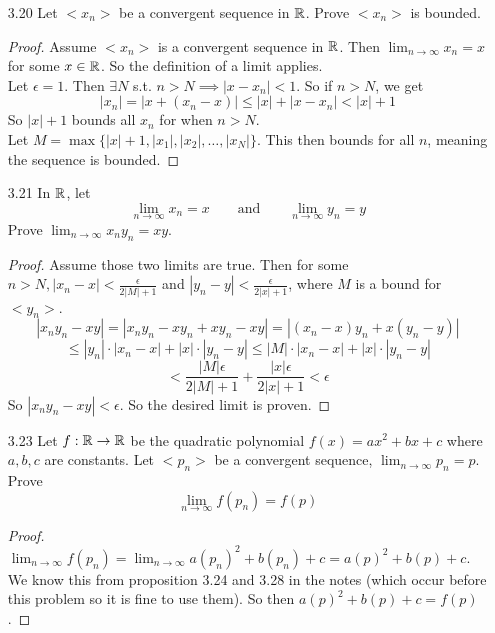 \documentclass[14pt]{extarticle}
\begin{document}
\begin{enumerate}
		\item[3.20] Let $<x_n>$ be a convergent sequence in $\mathbb{R}$. Prove $<x_n>$ is bounded.
		\begin{proof}
			Assume $<x_n>$ is a convergent sequence in $\mathbb{R}$. Then $\lim_{n\rightarrow\infty} x_n = x$ for some $x\in\mathbb{R}$. So the definition of a limit applies.\\
			Let $\epsilon = 1$. Then $\exists N$ s.t. $n > N \implies |x - x_n| < 1$. So if $n > N$, we get
			\[|x_n| = |x + (x_n - x)| \leq |x| + |x-x_n| < |x| + 1\]
			So $|x|+1$ bounds all $x_n$ for when $n>N$.\\
			Let $M = \max\{|x|+1,|x_1|,|x_2|,\ldots,|x_N|\}$. This then bounds for all $n$, meaning the sequence is bounded.
		\end{proof}
		
		\item[3.21] In $\mathbb{R}$, let 
		\[\lim_{n\rightarrow\infty} x_n = x \qquad \text{and} \qquad \lim_{n\rightarrow\infty} y_n = y\]
		Prove $\lim_{n\rightarrow\infty} x_ny_n = xy$.
		\begin{proof}
			Assume those two limits are true. Then for some $n>N, |x_n-x|<\frac{\epsilon}{2|M|+1}$ and $|y_n-y|<\frac{\epsilon}{2|x|+1}$, where $M$ is a bound for $<y_n>$.
			\[|x_ny_n - xy| = |x_ny_n - xy_n + xy_n-xy| = |(x_n-x)y_n + x(y_n-y)|\]
			\[\leq |y_n|\cdot|x_n-x| + |x|\cdot|y_n-y| \leq |M|\cdot|x_n-x| + |x|\cdot|y_n-y|\] 
			\[< \frac{|M|\epsilon}{2|M|+1} + \frac{|x|\epsilon}{2|x|+1} < \epsilon\]
			So $|x_ny_n - xy| <\epsilon$.
			So the desired limit is proven.
		\end{proof}
		
		\item[3.23] Let $f : \mathbb{R} \rightarrow \mathbb{R}$ be the quadratic polynomial $f(x) = ax^2 +bx +c$ where $a,b,c$ are constants. Let $<p_n>$ be a convergent sequence, $\lim_{n\rightarrow\infty} p_n = p$. Prove 
		\[\lim_{n\rightarrow\infty}f(p_n) = f(p)\]
		\begin{proof}
			$\lim_{n\rightarrow\infty} f(p_n) = \lim_{n\rightarrow\infty} a(p_n)^2 + b(p_n) + c = a(p)^2 + b(p) + c$. We know this from proposition 3.24 and 3.28 in the notes (which occur before this problem so it is fine to use them). So then $a(p)^2 + b(p) + c= f(p)$.
		\end{proof}
		

\end{enumerate}
\end{document}
